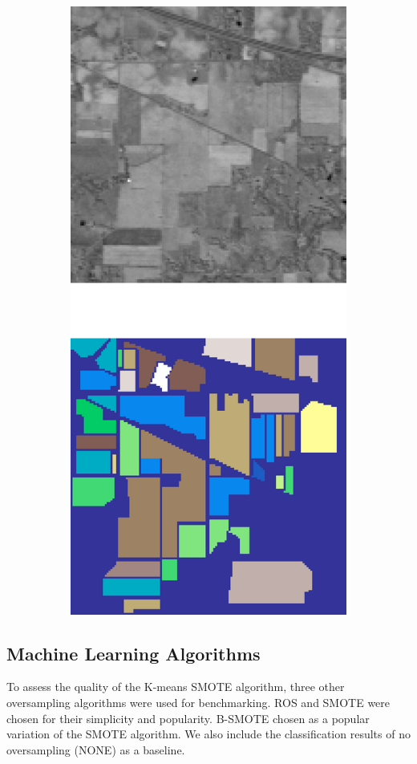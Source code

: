 \documentclass[authoryear,preprint,12pt]{elsarticle}
\begin{document}
\begin{linenumbers}
\begin{figure}[H]
\begin{subfigure}{.24\textwidth}
		\includegraphics[height=1.5\linewidth]{../analysis/indian_pines}
		\subcaption{{\medbreak}}\label{fig:indian_pines}
	\end{subfigure}
\end{figure}

\subsection{Machine Learning Algorithms}

To assess the quality of the K-means SMOTE algorithm,
three other oversampling algorithms were used for benchmarking. ROS and SMOTE
were chosen for their simplicity and popularity. B-SMOTE chosen as a popular
variation of the SMOTE algorithm. We also include the classification results
of no oversampling (NONE) as a baseline.


\end{linenumbers}
\end{document}
